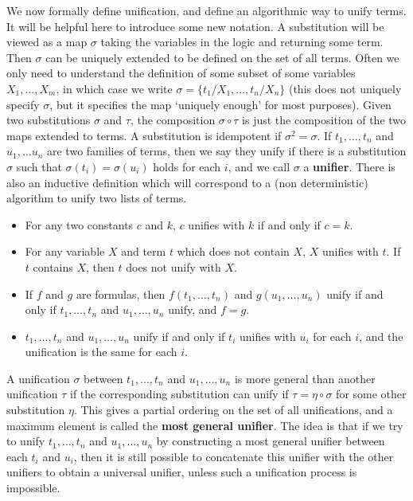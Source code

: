 We now formally define unification, and define an algorithmic way to unify terms. It will be helpful here to introduce some new notation. A substitution will be viewed as a map $\sigma$ taking the variables in the logic and returning some term. Then $\sigma$ can be uniquely extended to be defined on the set of all terms. Often we only need to understand the definition of some subset of some variables $X_1, \dots, X_m$, in which case we write $\sigma = \{ t_1/X_1, \dots, t_n/X_n \}$ (this does not uniquely specify $\sigma$, but it specifies the map `uniquely enough' for most purposes). Given two substitutions $\sigma$ and $\tau$, the composition $\sigma \circ \tau$ is just the composition of the two maps extended to terms. A substitution is idempotent if $\sigma^2 = \sigma$. If $t_1, \dots, t_n$ and $u_1, \dots u_n$ are two families of terms, then we say they unify if there is a substitution $\sigma$ such that $\sigma(t_i) = \sigma(u_i)$ holds for each $i$, and we call $\sigma$ a {\bf unifier}. There is also an inductive definition which will correspond to a (non deterministic) algorithm to unify two lists of terms.
%
\begin{itemize}
    \item For any two constants $c$ and $k$, $c$ unifies with $k$ if and only if $c = k$.
    \item For any variable $X$ and term $t$ which does not contain $X$, $X$ unifies with $t$. If $t$ contains $X$, then $t$ does not unify with $X$.
    \item If $f$ and $g$ are formulas, then $f(t_1, \dots, t_n)$ and $g(u_1, \dots, u_n)$ unify if and only if $t_1, \dots, t_n$ and $u_1, \dots, u_n$ unify, and $f = g$.
    \item $t_1, \dots, t_n$ and $u_1, \dots, u_n$ unify if and only if $t_i$ unifies with $u_i$ for each $i$, and the unification is the same for each $i$.
\end{itemize}
%
A unification $\sigma$ between $t_1, \dots, t_n$ and $u_1, \dots, u_n$ is more general than another unification $\tau$ if the corresponding substitution can unify if $\tau = \eta \circ \sigma$ for some other substitution $\eta$. This gives a partial ordering on the set of all unifications, and a maximum element is called the {\bf most general unifier}. The idea is that if we try to unify $t_1, \dots, t_n$ and $u_1, \dots, u_n$ by constructing a most general unifier between each $t_i$ and $u_i$, then it is still possible to concatenate this unifier with the other unifiers to obtain a universal unifier, unless such a unification process is impossible.
